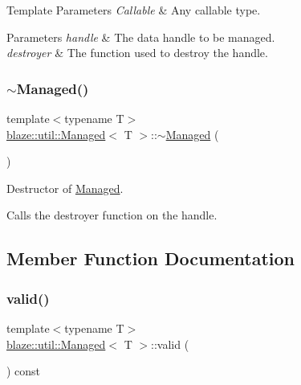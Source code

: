 \begin{DoxyTemplParams}{Template Parameters}
{\em Callable} & Any callable type.\\
\hline
\end{DoxyTemplParams}

\begin{DoxyParams}{Parameters}
{\em handle} & The data handle to be managed. \\
\hline
{\em destroyer} & The function used to destroy the handle. \\
\hline
\end{DoxyParams}
\mbox{\label{classblaze_1_1util_1_1Managed_a5e78234d198c17b18cb94936d68fe6ba}} 
\subsubsection{\texorpdfstring{$\sim$\+Managed()}{~Managed()}}
{\footnotesize\ttfamily template$<$typename T$>$ \\
\hyperlink{classblaze_1_1util_1_1Managed}{blaze\+::util\+::\+Managed}$<$ T $>$\+::$\sim$\hyperlink{classblaze_1_1util_1_1Managed}{Managed} (\begin{DoxyParamCaption}{ }\end{DoxyParamCaption})\hspace{0.3cm}{\ttfamily [inline]}}



Destructor of \hyperlink{classblaze_1_1util_1_1Managed}{Managed}. 

Calls the destroyer function on the handle. 

\subsection{Member Function Documentation}
\mbox{\label{classblaze_1_1util_1_1Managed_acaa4cd7a27ec898930f84162724d9f89}} 
\subsubsection{\texorpdfstring{valid()}{valid()}}
{\footnotesize\ttfamily template$<$typename T$>$ \\
\hyperlink{classblaze_1_1util_1_1Managed}{blaze\+::util\+::\+Managed}$<$ T $>$\+::valid (\begin{DoxyParamCaption}{ }\end{DoxyParamCaption}) const\hspace{0.3cm}{\ttfamily [inline]}}



